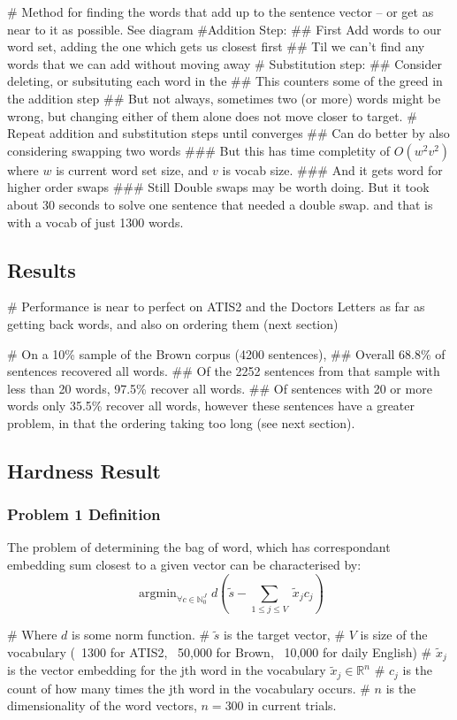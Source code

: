 \documentclass[]{scrartcl}
\DeclareMathOperator*{\argmin}{argmin}
\begin{document}
\begin{easylist}[itemize]
	# Method for finding the words that add up to the sentence vector -- or get as near to it as possible. See diagram
	#Addition Step:
	## First Add words to our word set, adding the one which gets us closest first
	## Til we can't find any words that we can add without moving away
	# Substitution step:
	## Consider deleting, or subsituting each word in the
	## This counters some of the greed in the addition step
	## But not always, sometimes two (or more) words might be wrong, but changing either of them alone does not move closer to target.
	# Repeat addition and substitution steps until converges
	## Can do better by also considering swapping two words
	### But this has time completity of $O(w^2 v^2)$ where $w$ is current word set size, and $v$ is vocab size.
	### And it gets word for higher order swaps
	### Still Double swaps may be worth doing. But it took about 30 seconds to solve one sentence that needed a double swap. and that is with a vocab of just 1300 words.
\end{easylist}

\subsection{Results}
\begin{easylist}[itemize]
	# Performance is near to perfect on ATIS2 and the Doctors Letters as far as getting back words, and also on ordering them (next section)
	
	# On a 10\% sample of the Brown corpus (4200 sentences),
	## Overall 68.8\% of sentences recovered all words.
	## Of the 2252 sentences from that sample with less than 20 words, 97.5\% recover all words. 
	## Of sentences with 20 or more words only 35.5\% recover all words, however these sentences have a greater problem, in that the ordering taking too long (see next section).
\end{easylist}

\subsection{Hardness Result}

\subsubsection{{Problem 1 Definition}}
The problem of determining the bag of word, which has correspondant embedding sum closest to a given vector can be characterised by:
$$\argmin_{\forall c\in\mathbb{N}_0^J} d(\tilde{s} - \sum_{1\le j\le V}\:\tilde{x}_{j}c_{j})$$
\begin{easylist}[itemize]
# Where $d$ is some norm function.
# $\tilde{s}$ is the target vector,
# $V$ is size of the vocabulary (~1300 for ATIS2, ~50,000 for Brown, ~10,000 for daily English)
# $\tilde{x}_j$ is the vector embedding for the jth word in the vocabulary $\tilde{x}_j \in \mathbb{R}^n$
# $c_j$ is the count of how many times the jth word in the vocabulary occurs.
# $n$ is the dimensionality of the word vectors, $n = 300$ in current trials.  
\end{easylist}
\end{document}
